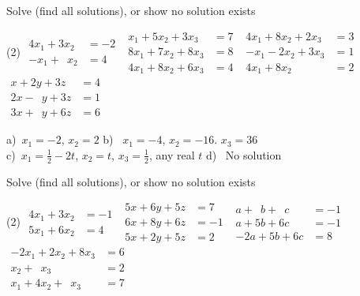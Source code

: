 \begin{exercise}
Solve (find all solutions), or show no solution exists
\begin{tasks}(2)
\task
$\begin{aligned}
 4x_1+3x_2 & = -2 \\
 -x_1+\phantom{3} x_2 & = 4
\end{aligned}$
\task
$\begin{aligned}
  x_1+5x_2+3x_3 & = 7 \\
 8x_1+7x_2+8x_3 & = 8 \\
 4x_1+8x_2+6x_3 & = 4
\end{aligned}$
\task
$\begin{aligned}
 4x_1+8x_2+2x_3 & = 3 \\
 -x_1-2x_2+3x_3 & = 1 \\
 4x_1+8x_2 \phantom{{}+3x_3} & = 2
\end{aligned}$
\task
$\begin{aligned}
  x+2y+3z & = 4 \\
2  x-\phantom{2} y+3z & = 1 \\
3  x+\phantom{2} y+6z & = 6
\end{aligned}$
\end{tasks}
\end{exercise}
\comboSol{%
}
{%
a)~$x_1 = -2$, $x_2 = 2$ \quad b)~ $x_1 = -4$, $x_2 = -16$. $x_3 = 36$ \\
c)~$x_1 = \frac{1}{2} - 2t$, $x_2 = t$, $x_3 = \frac{1}{2}$, any real $t$ \quad d)~ No solution
}

\begin{exercise}\ansMark%
Solve (find all solutions), or show no solution exists
\begin{tasks}(2)
\task
$\begin{aligned}
4x_1+3x_2 & = -1 \\
5x_1+6x_2 & = 4
\end{aligned}$
\task
$\begin{aligned}
 5x+6y+5z & = 7 \\
 6x+8y+6z & = -1 \\
 5x+2y+5z & = 2
\end{aligned}$
\task
$\begin{aligned}
a+\phantom{5}b+\phantom{6}c & = -1 \\
a+5b+6c & = -1 \\
-2a+5b+6c & = 8
\end{aligned}$
\task
$\begin{aligned}
-2 x_1+2x_2+8x_3 & = 6 \\
x_2+\phantom{8}x_3 & = 2 \\
x_1+4x_2+\phantom{8}x_3 & = 7
\end{aligned}$
\end{tasks}
\end{exercise}

